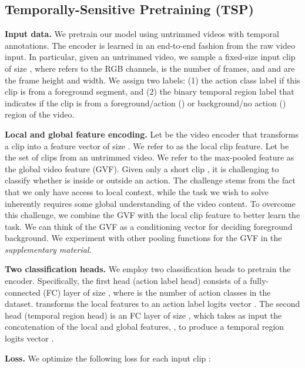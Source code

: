 \documentclass[10pt,twocolumn,letterpaper]{article}
\begin{document}
\subsection{Temporally-Sensitive Pretraining (TSP)}

\noindent\textbf{Input data.}
We pretrain our model using untrimmed videos with temporal annotations. The encoder is learned in an end-to-end fashion from the raw video input. In particular, given an untrimmed video, we sample a fixed-size input clip  of size , where  refers to the RGB channels,  is the number of frames, and  and  are the frame height and width. We assign  two labels: (1) the action class label  if this clip is from a foreground segment, and (2) the binary temporal region label  that indicates if the clip is from a foreground/action () or background/no action () region of the video. 

\vspace{3pt}\noindent\textbf{Local and global feature encoding.}
Let  be the video encoder that transforms a clip  into a feature vector  of size . We refer to  as the local clip feature. 
Let  be the set of clips from an untrimmed video. We refer to the max-pooled feature  as the global video feature (GVF). 
Given only a short clip , it is challenging to classify whether  is inside or outside an action. The challenge stems from the fact that we only have access to local context, while the task we wish to solve inherently requires some global understanding of the video content. To overcome this challenge, we combine the GVF with the local clip feature to better learn the task. We can think of the GVF as a conditioning vector for deciding foreground \vs background. We experiment with other pooling functions for the GVF in the \emph{supplementary material}.

\vspace{3pt}\noindent\textbf{Two classification heads.}
We employ two classification heads to pretrain the encoder. Specifically, the first head (action label head) consists of a fully-connected (FC) layer  of size , where  is the number of action classes in the dataset.  transforms the local features  to an action label logits vector . The second head (temporal region head) is an FC layer  of size , which takes as input the concatenation of the local and global features, , to produce a temporal region logits vector . 


\vspace{3pt}\noindent\textbf{Loss.} 
We optimize the following loss for each input clip :
\end{document}
